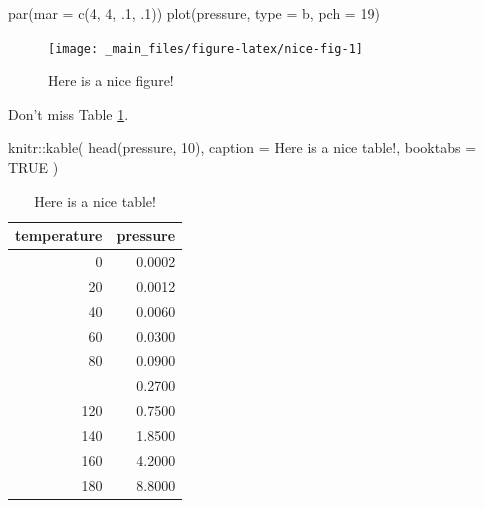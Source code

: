 \documentclass[
]{book}
\newenvironment{Shaded}{\begin{snugshade}}{\end{snugshade}}
\newcommand{\AttributeTok}[1]{\textcolor[rgb]{0.77,0.63,0.00}{#1}}
\newcommand{\ConstantTok}[1]{\textcolor[rgb]{0.00,0.00,0.00}{#1}}
\newcommand{\DecValTok}[1]{\textcolor[rgb]{0.00,0.00,0.81}{#1}}
\newcommand{\FunctionTok}[1]{\textcolor[rgb]{0.00,0.00,0.00}{#1}}
\newcommand{\NormalTok}[1]{#1}
\newcommand{\SpecialCharTok}[1]{\textcolor[rgb]{0.00,0.00,0.00}{#1}}
\newcommand{\StringTok}[1]{\textcolor[rgb]{0.31,0.60,0.02}{#1}}
\theoremstyle{definition}
\theoremstyle{definition}
\theoremstyle{definition}
\theoremstyle{definition}
\theoremstyle{remark}
\begin{document}
\begin{Shaded}
\begin{Highlighting}[]
\FunctionTok{par}\NormalTok{(}\AttributeTok{mar =} \FunctionTok{c}\NormalTok{(}\DecValTok{4}\NormalTok{, }\DecValTok{4}\NormalTok{, .}\DecValTok{1}\NormalTok{, .}\DecValTok{1}\NormalTok{))}
\FunctionTok{plot}\NormalTok{(pressure, }\AttributeTok{type =} \StringTok{\textquotesingle{}b\textquotesingle{}}\NormalTok{, }\AttributeTok{pch =} \DecValTok{19}\NormalTok{)}
\end{Highlighting}
\end{Shaded}

\begin{figure}

{\centering \texttt{[image: \_main\_files/figure-latex/nice-fig-1]} 

}

\caption{Here is a nice figure!}\label{fig:nice-fig}
\end{figure}

Don't miss Table \ref{tab:nice-tab}.

\begin{Shaded}
\begin{Highlighting}[]
\NormalTok{knitr}\SpecialCharTok{::}\FunctionTok{kable}\NormalTok{(}
  \FunctionTok{head}\NormalTok{(pressure, }\DecValTok{10}\NormalTok{), }\AttributeTok{caption =} \StringTok{\textquotesingle{}Here is a nice table!\textquotesingle{}}\NormalTok{,}
  \AttributeTok{booktabs =} \ConstantTok{TRUE}
\NormalTok{)}
\end{Highlighting}
\end{Shaded}

\begin{table}

\caption{\label{tab:nice-tab}Here is a nice table!}
\centering
\begin{tabular}[t]{rr}
\toprule
temperature & pressure\\
\midrule
0 & 0.0002\\
20 & 0.0012\\
40 & 0.0060\\
60 & 0.0300\\
80 & 0.0900\\
\addlinespace
100 & 0.2700\\
120 & 0.7500\\
140 & 1.8500\\
160 & 4.2000\\
180 & 8.8000\\
\bottomrule
\end{tabular}
\end{table}
\end{document}
